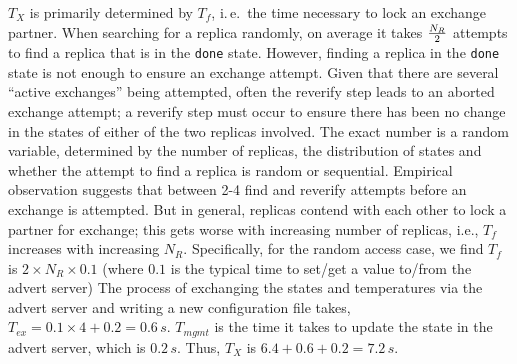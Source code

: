 \documentclass{rspublic}
\newcommand{\alnote}[1]{ {\textcolor{blue} { ***andre: #1 }}}
\newcommand{\athotanote}[1]{ {\textcolor{green} { ***athota: #1 }}}
\newcommand{\alnote}[1]{}
\newcommand{\athotanote}[1]{}
\begin{document}


$T_{X}$ is primarily determined by $T_f$, i.\,e.\ the time necessary
to lock an exchange partner.  When searching for a replica randomly,
on average it takes $N_R \over 2$ attempts to find a replica that is
in the \texttt{done} state.  However, finding a replica in the
\texttt{done} state is not enough to ensure an exchange attempt.
Given that there are several ``active exchanges'' being attempted,
often the reverify step leads to an aborted exchange attempt; a
reverify step must occur to ensure there has been no change in the
states of either of the two replicas involved.  The exact number is a
random variable, determined by the number of replicas, the
distribution of states and whether the attempt to find a replica is
random or sequential. Empirical observation suggests that between 2-4
find and reverify attempts before an exchange is attempted.  But in
general, replicas contend with each other to lock a partner for
exchange; this gets worse with increasing number of replicas, i.e.,
$T_f$ increases with increasing $N_R$.  Specifically, for the random
access case, we find $T_f$ is $2 \times N_R \times 0.1$ (where $0.1$
is the typical time to set/get a value to/from the advert server)
The process of exchanging the
states and temperatures via the advert server and writing a new
configuration file takes, $T_{ex} = 0.1\times 4 +0.2 = 0.6\,s$. %
$T_{mgmt}$ is the time it takes to update the state in the advert
server, which is $0.2\,s$.  Thus, $T_{X}$ is $6.4+0.6 +0.2=
7.2\,s$.  %

\end{document}
